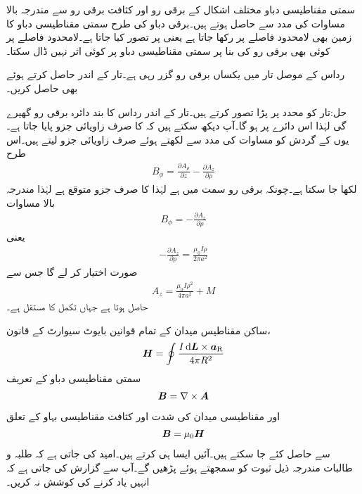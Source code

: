 سمتی مقناطیسی دباو مختلف اشکال کے برقی رو اور کثافت برقی رو سے مندرجہ بالا مساوات کی مدد سے حاصل ہوتے ہیں۔برقی دباو کی طرح سمتی مقناطیسی دباو کا زمین بھی لامحدود فاصلے پر رکھا جاتا ہے یعنی  پر  تصور کیا جاتا ہے۔لامحدود فاصلے پر کوئی بھی برقی رو  کی بنا پر سمتی مقناطیسی دباو پر کوئی اثر نہیں ڈال سکتا۔

رداس  کے موصل تار میں یکساں برقی رو  گزر رہی ہے۔تار کے اندر  حاصل کرتے ہوئے  بھی حاصل کریں۔

حل:تار کو  محدد پر پڑا تصور کرتے ہیں۔تار کے اندر  رداس کا بند دائرہ  برقی رو گھیرے گی لہٰذا اس دائرے پر  ہو گا۔آپ دیکھ سکتے ہیں کہ  کا صرف زاویائی جزو پایا جاتا ہے۔یوں  کے گردش کو مساوات  کی مدد سے لکھتے ہوئے صرف زاویائی جزو لیتے ہیں۔اس طرح
\begin{align*}
B_{\phi}=\frac{\partial A_\rho}{\partial z}-\frac{\partial A_z}{\partial \rho}
\end{align*} 
لکھا جا سکتا ہے۔چونکہ برقی رو   سمت میں ہے لہٰذا  کا صرف  جزو متوقع ہے لہٰذا مندرجہ بالا مساوات 
\begin{align*}
B_{\phi}=-\frac{\partial A_z}{\partial \rho}
\end{align*} 
یعنی
\begin{align*}
-\frac{\partial A_z}{\partial \rho}=\frac{\mu_0 I \rho}{2\pi a^2}
\end{align*}
صورت  اختیار کر لے گا جس سے
\begin{align*}
A_z= \tfrac{\mu_0 I \rho^2 }{4\pi a^2} +M
\end{align*}
حاصل ہوتا ہے جہاں  تکمل کا مستقل ہے۔

ساکن مقناطیس میدان کے تمام قوانین بایوٹ سیوارٹ کے قانون،
\begin{align}\label{مساوات_مقناطیسی_بایوٹ_سیوارٹ_قانون_بطور_ثبوت}
\kvec{H}=\oint \frac{I \dif \kvec{L} \times \aR}{4\pi R^2}
\end{align}
سمتی مقناطیسی دباو کے تعریف
\begin{align}\label{مساوات-مقناطیسی_سمتی_مقناطیسی_دباو_تعریف_دوبارہ}
{\ensuremath{{\boldsymbol{B}}}}=\nabla \times {\ensuremath{{\boldsymbol{A}}}}
\end{align}
اور مقناطیسی میدان کی شدت اور کثافت مقناطیسی  بہاو کے تعلق
\begin{align}\label{مساوات_مقناطیسی_شدت_اور_کثافت_بہاو_کا_تعلق}
{\ensuremath{{\boldsymbol{B}}}}=\mu_0 {{\boldsymbol{H}}}
\end{align}
سے حاصل کئے جا سکتے ہیں۔آئیں ایسا ہی کرتے  ہیں۔امید کی جاتی ہے کہ طلبہ و طالبات مندرجہ ذیل ثبوت کو سمجھتے ہوئے پڑھیں گے۔آپ سے گزارش کی جاتی ہے کہ انہیں یاد کرنے کی کوشش نہ کریں۔


